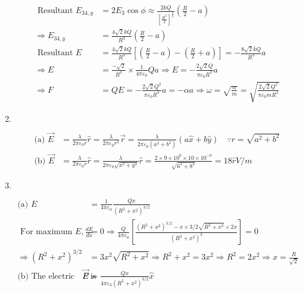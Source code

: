 \begin{enumerate}
\begin{answer}
\begin{align*}
	\text { Resultant } E_{34, y}&=2 E_{3} \cos \phi \approx \frac{2 k Q}{\left[\frac{R^{2}}{2}\right]^{\frac{3}{2}}}\left(\frac{R}{2}-a\right) \\
	\Rightarrow E_{34, y}&=\frac{4 \sqrt{2} k Q}{R^{3}}\left(\frac{R}{2}-a\right) \\
	\text { Resultant } E&=\frac{4 \sqrt{2} k Q}{R^{3}}\left[\left(\frac{R}{2}-a\right)-\left(\frac{R}{2}+a\right)\right]=-\frac{8 \sqrt{2} k Q}{R^{3}} a\\
\Rightarrow E&=\frac{-\sqrt{2}}{R^{3}} \times \frac{1}{4 \pi \varepsilon_{0}} Q a \Rightarrow E=-\frac{2 \sqrt{2} Q}{\pi \varepsilon_{0} R^{3}} a\\
	\Rightarrow F&=Q E=-\frac{2 \sqrt{2} Q^{2}}{\pi \varepsilon_{0} R^{3}} a=-\alpha a \Rightarrow \omega=\sqrt{\frac{\alpha}{m}}=\sqrt{\frac{2 \sqrt{2} Q^{2}}{\pi \varepsilon_{0} m R^{3}}}
	\end{align*}
\end{answer}
\item $\left. \right. $
\begin{answer}
	\begin{align*}
 \text{(a) }\vec{E}&=\frac{\lambda}{2 \pi \varepsilon_{0} r} \hat{r}=\frac{\lambda}{2 \pi \varepsilon_{0} r^{2}} \vec{r}=\frac{\lambda}{2 \pi \varepsilon_{0}\left(a^{2}+b^{2}\right)}(a \hat{x}+b \hat{y}) \quad \because r=\sqrt{a^{2}+b^{2}}\\
	\text{(b) }\vec{E}&=\frac{\lambda}{2 \pi \varepsilon_{0} r} \hat{r}=\frac{\lambda}{2 \pi \varepsilon_{0} \sqrt{x^{2}+y^{2}}} \hat{r}=\frac{2 \times 9 \times 10^{9} \times 10 \times 10^{-9}}{\sqrt{6^{2}+8^{2}}}=18 \hat{r} V / m
	\end{align*}
\end{answer}
\item $\left. \right. $
\begin{answer}
	\begin{align*}
\text{(a) }E&=\frac{1}{4 \pi \varepsilon_{0}} \frac{Q x}{\left(R^{2}+x^{2}\right)^{3 / 2}}\\
\text{	For maximum }E, \frac{d E}{d x}&=0 \Rightarrow \frac{Q}{4 \pi \varepsilon_{0}}\left[\frac{\left(R^{2}+x^{2}\right)^{3 / 2}-x \times 3 / 2 \sqrt{R^{2}+x^{2}} \times 2 x}{\left(R^{2}+x^{2}\right)^{3}}\right]=0\\ \Rightarrow\left(R^{2}+x^{2}\right)^{3 / 2}&=3 x^{2} \sqrt{R^{2}+x^{2}} \Rightarrow R^{2}+x^{2}=3 x^{2} \Rightarrow R^{2}=2 x^{2} \Rightarrow x=\frac{R}{\sqrt{2}}\\
	\text{(b) The electric field at point $P$ is }\vec{E}&=\frac{Q x}{4 \pi \varepsilon_{0}\left(R^{2}+x^{2}\right)^{3 / 2}} \hat{x}\\

\end{align*}
\end{answer}
\end{enumerate}
